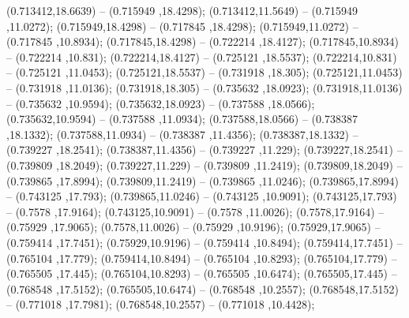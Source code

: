  (0.713412,18.6639) -- (0.715949 ,18.4298);
 (0.713412,11.5649) -- (0.715949 ,11.0272);
 (0.715949,18.4298) -- (0.717845 ,18.4298);
 (0.715949,11.0272) -- (0.717845 ,10.8934);
 (0.717845,18.4298) -- (0.722214 ,18.4127);
 (0.717845,10.8934) -- (0.722214 ,10.831);
 (0.722214,18.4127) -- (0.725121 ,18.5537);
 (0.722214,10.831) -- (0.725121 ,11.0453);
 (0.725121,18.5537) -- (0.731918 ,18.305);
 (0.725121,11.0453) -- (0.731918 ,11.0136);
 (0.731918,18.305) -- (0.735632 ,18.0923);
 (0.731918,11.0136) -- (0.735632 ,10.9594);
 (0.735632,18.0923) -- (0.737588 ,18.0566);
 (0.735632,10.9594) -- (0.737588 ,11.0934);
 (0.737588,18.0566) -- (0.738387 ,18.1332);
 (0.737588,11.0934) -- (0.738387 ,11.4356);
 (0.738387,18.1332) -- (0.739227 ,18.2541);
 (0.738387,11.4356) -- (0.739227 ,11.229);
 (0.739227,18.2541) -- (0.739809 ,18.2049);
 (0.739227,11.229) -- (0.739809 ,11.2419);
 (0.739809,18.2049) -- (0.739865 ,17.8994);
 (0.739809,11.2419) -- (0.739865 ,11.0246);
 (0.739865,17.8994) -- (0.743125 ,17.793);
 (0.739865,11.0246) -- (0.743125 ,10.9091);
 (0.743125,17.793) -- (0.7578 ,17.9164);
 (0.743125,10.9091) -- (0.7578 ,11.0026);
 (0.7578,17.9164) -- (0.75929 ,17.9065);
 (0.7578,11.0026) -- (0.75929 ,10.9196);
 (0.75929,17.9065) -- (0.759414 ,17.7451);
 (0.75929,10.9196) -- (0.759414 ,10.8494);
 (0.759414,17.7451) -- (0.765104 ,17.779);
 (0.759414,10.8494) -- (0.765104 ,10.8293);
 (0.765104,17.779) -- (0.765505 ,17.445);
 (0.765104,10.8293) -- (0.765505 ,10.6474);
 (0.765505,17.445) -- (0.768548 ,17.5152);
 (0.765505,10.6474) -- (0.768548 ,10.2557);
 (0.768548,17.5152) -- (0.771018 ,17.7981);
 (0.768548,10.2557) -- (0.771018 ,10.4428);
